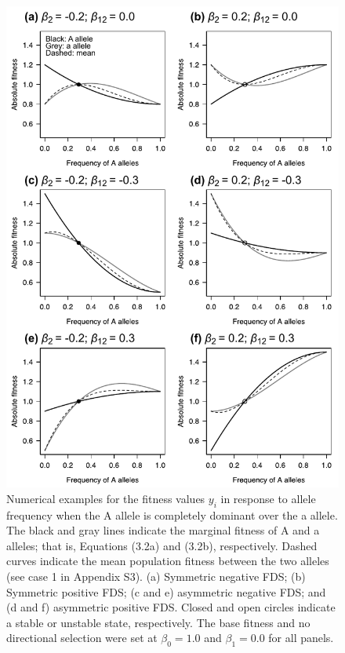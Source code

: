 \documentclass[12pt,]{article}
\begin{document}
\begin{figure}[]
  \includegraphics[width=0.75\linewidth]{Fig2_AsymFDSdomi.pdf}
  \caption{Numerical examples for the fitness values $y_i$ in response to allele frequency when the A allele is completely dominant over the a allele. The black and gray lines indicate the marginal fitness of A and a alleles; that is, Equations (3.2a) and (3.2b), respectively. Dashed curves indicate the mean population fitness between the two alleles (see case 1 in Appendix S3). (a) Symmetric negative FDS; (b) Symmetric positive FDS; (c and e) asymmetric negative FDS; and (d and f) asymmetric positive FDS. Closed and open circles indicate a stable or unstable state, respectively. The base fitness and no directional selection were set at $\beta_0=1.0$ and $\beta_1=0.0$ for all panels.}
  \label{fig2:asym}
\end{figure}
\end{document}
